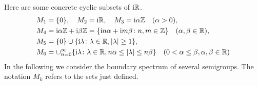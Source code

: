 	Here are some concrete cyclic subsets of\/ $\mathrm{i} \mathbb{R}$.
	\begin{align*}
		M_{1} &= \{0\}, \quad M_{2} = \im\R, \quad M_{3} = \im\alpha\Z \quad (\alpha > 0), \\
		M_{4} &= \im\alpha\Z + \im\beta\Z = \{\im n\alpha +  \im m\beta \colon n,m \in \Z\} \quad (\alpha, \beta \in \R), \\
		M_{5} &= \{0\} \cup \{\im \lambda \colon \lambda \in \R, |\lambda| \geq 1\}, \\
		M_{6} &= \cup_{n=0}^{\infty}\{\im \lambda \colon \lambda \in \R, n\alpha \leq |\lambda| \leq n\beta\} \quad (0 < \alpha \leq \beta, \alpha,\beta \in \R)
	\end{align*}
	In the following we consider the boundary spectrum of several semigroups. 
    The notation $M_{k}$ refers to the sets just defined.
